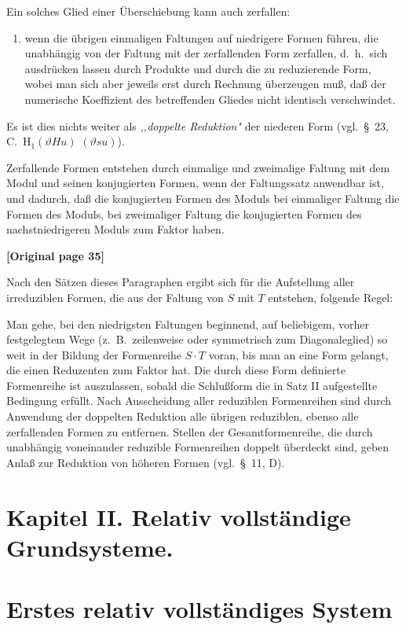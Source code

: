\documentclass[12pt,a4paper]{article}
\begin{document}
Ein solches Glied einer Überschiebung kann auch zerfallen:
\begin{enumerate}
\item[c)] wenn die übrigen einmaligen Faltungen auf niedrigere Formen führen, die unabhängig von der Faltung mit der zerfallenden Form zerfallen, d.\ h.\ sich ausdrücken lassen durch Produkte und durch die zu reduzierende Form, wobei man sich aber jeweils erst durch Rechnung überzeugen muß, daß der numerische Koeffizient des betreffenden Gliedes nicht identisch verschwindet.
\end{enumerate}
Es ist dies nichts weiter als \textit{,,doppelte Reduktion"{}} der niederen Form (vgl.\ \S\ 23, C.\ H$_1(\vartheta Hu)$ $(\vartheta su)$).

Zerfallende Formen entstehen durch einmalige und zweimalige Faltung mit dem Modul und seinen konjugierten Formen, wenn der Faltungssatz anwendbar ist, und dadurch, daß die konjugierten Formen des Moduls bei einmaliger Faltung die Formen des Moduls, bei zweimaliger Faltung die konjugierten Formen des nachstniedrigeren Moduls zum Faktor haben.

\noindent\textbf{[Original page 35]}

Nach den Sätzen dieses Paragraphen ergibt sich für die Aufstellung aller irreduziblen Formen, die aus der Faltung von $S$ mit $T$ entstehen, folgende Regel:

Man gehe, bei den niedrigsten Faltungen beginnend, auf beliebigem, vorher festgelegtem Wege (z.\ B.\ zeilenweise oder symmetrisch zum Diagonaleglied) so weit in der Bildung der Formenreihe $S \cdot T$ voran, bis man an eine Form gelangt, die einen Reduzenten zum Faktor hat. Die durch diese Form definierte Formenreihe ist auszulassen, sobald die Schlußform die in Satz II aufgestellte Bedingung erfüllt. Nach Ausscheidung aller reduziblen Formenreihen sind durch Anwendung der doppelten Reduktion alle übrigen reduziblen, ebenso alle zerfallenden Formen zu entfernen. Stellen der Gesamtformenreihe, die durch unabhängig voneinander reduzible Formenreihen doppelt überdeckt sind, geben Anlaß zur Reduktion von höheren Formen (vgl.\ \S\ 11, D).

\section*{Kapitel II. Relativ vollständige Grundsysteme.}

\section{Erstes relativ vollständiges System}
\end{document}
